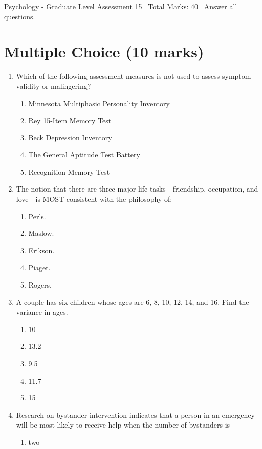 \documentclass[12pt]{article}
\begin{document}
\begin{center}
Psychology - Graduate Level Assessment 15 \
Total Marks: 40 \
Answer all questions.
\end{center}

\section*{Multiple Choice (10 marks)}
\begin{enumerate}[label=\arabic*.]
\item Which of the following assessment measures is not used to assess symptom validity or malingering?
\begin{enumerate}[label=(\alph*)]
    \item Minnesota Multiphasic Personality Inventory
    \item Rey 15-Item Memory Test
    \item Beck Depression Inventory
    \item The General Aptitude Test Battery
    \item Recognition Memory Test
\end{enumerate}
\item The notion that there are three major life tasks - friendship, occupation, and love - is MOST consistent with the philosophy of:
\begin{enumerate}[label=(\alph*)]
    \item Perls.
    \item Maslow.
    \item Erikson.
    \item Piaget.
    \item Rogers.
\end{enumerate}
\item A couple has six children whose ages are 6, 8, 10, 12, 14, and 16. Find the variance in ages.
\begin{enumerate}[label=(\alph*)]
    \item 10
    \item 13.2
    \item 9.5
    \item 11.7
    \item 15
\end{enumerate}
\item Research on bystander intervention indicates that a person in an emergency will be most likely to receive help when the number of bystanders is
\begin{enumerate}[label=(\alph*)]
    \item two

\end{enumerate}
\end{enumerate}
\end{document}
